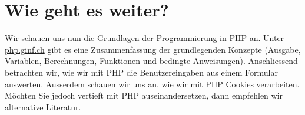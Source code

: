 \section{Wie geht es weiter?}

Wir schauen uns nun die Grundlagen der Programmierung in \ac{PHP} an. Unter \url{php.ginf.ch} gibt es eine Zusammenfassung der grundlegenden Konzepte (Ausgabe, Variablen, Berechnungen, Funktionen und bedingte Anweisungen). Anschliessend betrachten wir, wie wir mit \ac{PHP} die Benutzereingaben aus einem Formular auswerten. Ausserdem schauen wir uns an, wie wir mit \ac{PHP} Cookies verarbeiten. Möchten Sie jedoch vertieft mit \ac{PHP} auseinandersetzen, dann empfehlen wir alternative Literatur.
